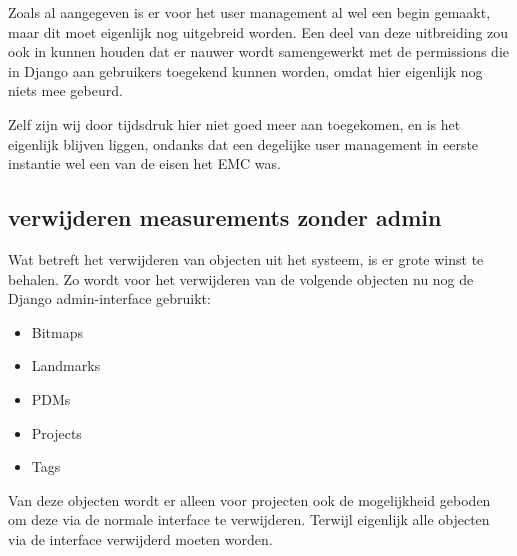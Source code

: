 Zoals al aangegeven is er voor het user management al wel een begin gemaakt, maar dit moet eigenlijk nog uitgebreid worden.
Een deel van deze uitbreiding zou ook in kunnen houden dat er nauwer wordt samengewerkt met de permissions die in Django aan gebruikers toegekend kunnen worden, omdat hier eigenlijk nog niets mee gebeurd.

Zelf zijn wij door tijdsdruk hier niet goed meer aan toegekomen, en is het eigenlijk blijven liggen, ondanks dat een degelijke user management in eerste instantie wel een van de eisen het EMC was.

\subsection{verwijderen measurements zonder admin}
Wat betreft het verwijderen van objecten uit het systeem, is er grote winst te behalen.
Zo wordt voor het verwijderen van de volgende objecten nu nog de Django admin-interface gebruikt:
\begin{itemize}
  \item Bitmaps
  \item Landmarks
  \item PDMs
  \item Projects
  \item Tags
\end{itemize}
Van deze objecten wordt er alleen voor projecten ook de mogelijkheid geboden om deze via de normale interface te verwijderen. 
Terwijl eigenlijk alle objecten via de interface verwijderd moeten worden.

